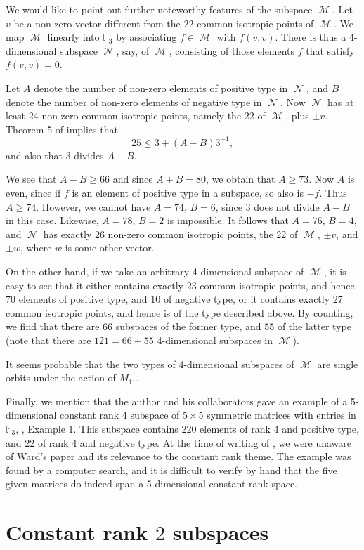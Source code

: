 \documentclass{amsart}
\DeclareMathOperator{\M}{\mathcal{M}}
\DeclareMathOperator{\N}{\mathcal{N}}
\theoremstyle{plain}
\theoremstyle{definition}
\begin{document}
We would like to point out further noteworthy features of the subspace $\M$. Let $v$ be a non-zero vector different from the 22 common isotropic points of $\M$. We map $\M$ linearly into $\mathbb{F}_{3}$ by associating $f\in\M$ with $f(v,v)$. There is thus a 4-dimensional
subspace $\N$, say, of $\M$, consisting of those elements $f$ that satisfy $f(v,v)=0$.

Let $A$ denote the number of non-zero elements of positive type in $\N$, and $B$ denote the number of non-zero elements of negative type in $\N$.
Now $\N$ has at least 24 non-zero common isotropic points, namely the 22 of $\M$, plus $\pm v$. Theorem 5 of \cite{DGS} implies that
\[
 25\leq 3+(A-B)3^{-1},
\]
and also that 3 divides $A-B$. 

We see that $A-B\geq 66$ and since $A+B=80$, we obtain that $A\geq 73$. Now $A$ is even, since if $f$ is an element of positive type in
a subspace, so also is $-f$. Thus $A\geq 74$. However, we cannot have $A=74$, $B=6$, since 3 does not divide $A-B$ in this case. Likewise,
$A=78$, $B=2$ is impossible. It follows that $A=76$, $B=4$, and $\N$ has exactly 26 non-zero common isotropic points, the 22 of $\M$, $\pm v$, and
$\pm w$, where $w$ is some other vector.

On the other hand, if we take an arbitrary 4-dimensional subspace of $\M$, it is easy to see that it either contains exactly 23 common isotropic
points, and hence 70 elements of positive type, and 10 of negative type, or it contains exactly 27 common isotropic points, and hence is of the type described above. By counting, we find that there are 66 subspaces of the former type, and 55 of the latter type (note that there are
$121=66+55$ 4-dimensional subspaces in $\M$). 

It seems probable that the two types of 4-dimensional subspaces of $\M$ are single orbits  under the action of $M_{11}$.

Finally, we mention that the author and his collaborators gave an example of a 5-dimensional constant rank 4 subspace of $5\times 5$ symmetric matrices with entries in $\mathbb{F}_{3}$, \cite{DGS}, Example 1. This subspace contains 220 elements of rank 4 and positive type, and 22 of rank 4 and negative type. At the time of writing of \cite{DGS}, we were unaware of Ward's paper and its relevance to the constant rank theme. The example was found by a computer search, and it is difficult to verify by hand that the five given matrices do indeed span a 5-dimensional constant rank space.

\section{Constant rank $2$ subspaces}
\end{document}
